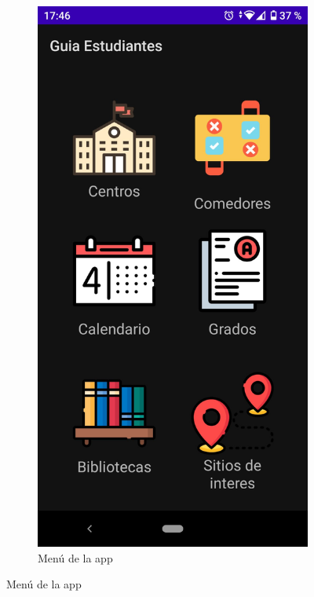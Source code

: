 \documentclass[a4paper,11pt]{article}
\begin{document}
\begin{figure}[H]
\begin{subfigure}{0.41\textwidth}
  \raggedleft
  \includegraphics[width=1\linewidth]{imagenes/menu.jpeg}  
  \caption{Menú de la app}

\end{subfigure}
\end{figure}
\end{document}
